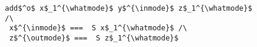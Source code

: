 \begin{figure}[!t]
  \centering
  \begin{minipage}{0.57\columnwidth}
    \begin{lstlisting}[frame=tb]
 add$^o$ x$_1^{\whatmode}$ y$^{\inmode}$ z$_1^{\whatmode}$ /\
 x$^{\inmode}$ ===  S x$_1^{\whatmode}$ /\
 z$^{\outmode}$ ===  S z$_1^{\whatmode}$
    \end{lstlisting}
  \end{minipage}
\end{figure}